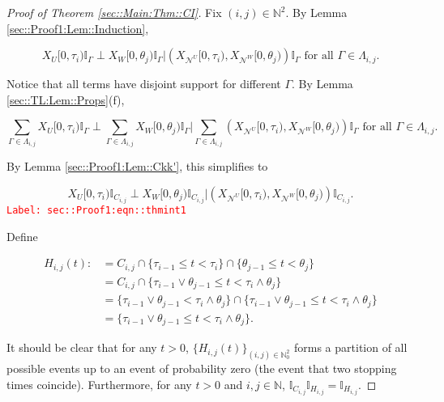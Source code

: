 \documentclass[12pt]{article}
\newcommand{\mb}{\mathbb}
\newcommand{\mc}{\mathcal}
\newcommand{\te}{\text}
\newcommand{\tr}{\textcolor{red}}
\newcommand{\labe}[1]{\tr{\texttt{Label: #1}}}
\renewcommand{\U}{U}							%
\newcommand{\UU}{W}								%
\renewcommand{\t}{t}							%
\newcommand{\X}{X}								%
\newcommand{\neigh}{\mc{N}}						%
\newcommand{\vind}[1]{^{#1}}					%
\newcommand{\cind}[1]{_{#1}}					%
\newcommand{\tip}[1]{#1}						%
\newcommand{\indx}[1]{_{#1}}					%
\newcommand{\rt}{\tau}							%
\newcommand{\rtt}{\theta}						%
\newcommand{\apath}{\Gamma}						%
\newcommand{\pathset}[2]{\Lambda_{#1,#2}}		%
\newcommand{\pathsete}[2]{C_{#1,#2}}			%
\newcommand{\pathseted}[2]{H_{#1,#2}}			%
\begin{document}
\begin{proof}[Proof of Theorem \ref{sec::Main:Thm::CI}]

Fix \((i,j) \in \mb{N}^2\). By Lemma \ref{sec::Proof1:Lem::Induction}, 

\[\X\cind{\U}\tip{[0,\rt\indx{i})}\mb{I}_{\apath}\perp \X\cind{\UU}\tip{[0,\rtt\indx{j})}\mb{I}_{\apath}\big|\left(\X\cind{\neigh\vind{\U}}\tip{[0,\rt\indx{i})},\X\cind{\neigh\vind{\UU}}\tip{[0,\rtt\indx{j})}\right)\mb{I}_{\apath}\te{ for all }\apath \in \pathset{i}{j}.\]

Notice that all terms have disjoint support for different \(\apath\). By Lemma \ref{sec::TL:Lem::Props}(f), 

\[\sum_{\apath\in\pathset{i}{j}}\X\cind{\U}\tip{[0,\rt\indx{i})}\mb{I}_{\apath}\perp \sum_{\apath\in\pathset{i}{j}}\X\cind{\UU}\tip{[0,\rtt\indx{j})}\mb{I}_{\apath}\bigg|\sum_{\apath\in\pathset{i}{j}}\left(\X\cind{\neigh\vind{\U}}\tip{[0,\rt\indx{i})},\X\cind{\neigh\vind{\UU}}\tip{[0,\rtt\indx{j})}\right)\mb{I}_{\apath}\te{ for all }\apath \in \pathset{i}{j}.\]

By Lemma \ref{sec::Proof1:Lem::Ckk'}, this simplifies to 

\begin{equation}
\X\cind{\U}\tip{[0,\rt\indx{i})}\mb{I}_{\pathsete{i}{j}}\perp \X\cind{\UU}\tip{[0,\rtt\indx{j})}\mb{I}_{\pathsete{i}{j}}\big|\left(\X\cind{\neigh\vind{\U}}\tip{[0,\rt\indx{i})},\X\cind{\neigh\vind{\UU}}\tip{[0,\rtt\indx{j})}\right)\mb{I}_{\pathsete{i}{j}}.
\label{sec::Proof1:eqn::thmint1}
\end{equation}
\labe{sec::Proof1:eqn::thmint1}

Define

\begin{align*}
\pathseted{i}{j}(\t) :&= \pathsete{i}{j}\cap \{\rt\indx{i-1}\leq \t < \rt\indx{i}\}\cap \{\rtt\indx{j-1} \leq \t < \rtt\indx{j}\}\\
&=\pathsete{i}{j}\cap\{\rt\indx{i-1}\vee\rtt\indx{j-1} \leq \t < \rt\indx{i}\wedge \rtt\indx{j}\}\\
&=\{\rt\indx{i-1}\vee\rtt\indx{j-1}  < \rt\indx{i}\wedge \rtt\indx{j}\} \cap \{\rt\indx{i-1}\vee\rtt\indx{j-1} \leq \t < \rt\indx{i}\wedge \rtt\indx{j}\}\\
&= \{\rt\indx{i-1}\vee\rtt\indx{j-1} \leq \t < \rt\indx{i}\wedge \rtt\indx{j}\}.
\end{align*}

It should be clear that for any \(\t > 0\), \(\{\pathseted{i}{j}(\t)\}_{(i,j)\in\mb{N}_0^2}\) forms a partition of all possible events up to an event of probability zero (the event that two stopping times coincide). Furthermore, for any \(\t > 0\) and \(i,j\in \mb{N}\), \(\mb{I}_{\pathsete{i}{j}}\mb{I}_{\pathseted{i}{j}} = \mb{I}_{\pathseted{i}{j}}\).


\end{proof}
\end{document}

